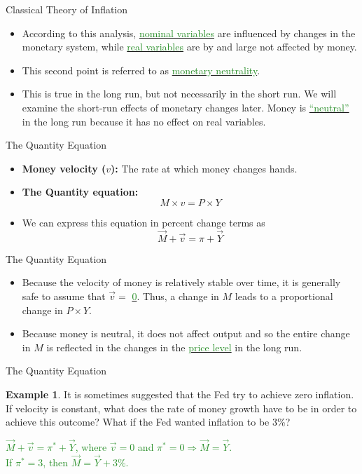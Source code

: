 \documentclass[xcolor={dvipsnames},pdf, hyperref={colorlinks=true, citecolor=ForestGreen, linkcolor=BlueViolet, urlcolor=Magenta}]{beamer}
\theoremstyle{definition}
\newtheorem{exmp}{Example}[section]
\newcommand{\defn}[1]{\textbf{#1}}
\newcommand{\ddp}[1]{{\textcolor{ForestGreen}{#1}}}
\newcommand{\dd}[1]{{\underline{\textcolor{ForestGreen}{#1}}}}
\begin{document}
\begin{frame}{Classical Theory of Inflation}
	\begin{itemize}
		\item According to this analysis, \dd{nominal variables} are influenced by changes in the monetary system, while \dd{real variables} are by and large not affected by money.
		\item This second point is referred to as \dd{monetary neutrality}.
		\item This is true in the long run, but not necessarily in the short run. We will examine the short-run effects of monetary changes later. Money is \dd{``neutral''} in the long run because it has no effect on real variables.
	\end{itemize}
\end{frame}

\begin{frame}{The Quantity Equation}
	\begin{itemize}
		\item \defn{Money velocity ($v$):} The rate at which money changes hands.
		\item \defn{The Quantity equation:} \[M \times v = P \times Y\]
		\item We can express this equation in percent change terms as \[\vec{M} + \vec{v} = \pi + \vec{Y}\]
	
	\end{itemize}
\end{frame}

\begin{frame}{The Quantity Equation}
\begin{itemize}
	\item Because the velocity of money is relatively stable over time, it is generally safe to assume that $\vec{v} = $ \dd{0}. Thus, a change in $M$ leads to a proportional change in $P \times Y$. 
	\item Because money is neutral, it does not affect output and so the entire change in $M$ is reflected in the changes in the \dd{price level} in the long run. 
\end{itemize}
\end{frame}


\begin{frame}{The Quantity Equation}
\begin{exmp}
	It is sometimes suggested that the Fed try to achieve zero inflation. If velocity is constant, what does the rate of money growth have to be in order to achieve this outcome? What if the Fed wanted inflation to be 3\%?
\end{exmp} 
\ddp{\pause $\vec{M} + \vec{v} = \pi^* + \vec{Y}$, where $\vec{v} = 0$ and $\pi^* = 0 \Rightarrow \vec{M} = \vec{Y}$. \\
	\pause If $\pi^* = 3$, then $\vec{M} = \vec{Y} + 3\%$.}
\end{frame}
\end{document}
